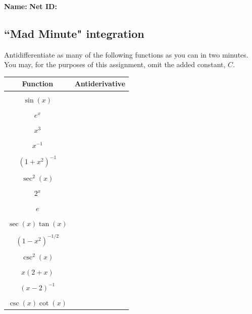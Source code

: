 \documentclass[12pt,letterpaper]{article}
\theoremstyle{definition}
\theoremstyle{remark}
\begin{document}

\begin{center}
\textbf{Name:} \underline{\hspace{2.2in}} \hfill \textbf{Net ID:} \underline{\hspace{2in}}

\end{center}


\begin{center}
\end{center}
\subsection*{``Mad Minute" integration}

\noindent Antidifferentiate as many of the following functions as you can in two minutes. You may, for the purposes of this assignment, omit the added constant, $C$. 

\begin{center}

\begin{tabularx}{\textwidth}{|c|X|}
  \hline \textbf{Function} & \textbf{Antiderivative} \\
\hline
\hline & \\ 
 $\sin(x)$  & \\ \hline
   \hline & \\ $   e^x$ & \\ \hline 
   \hline &\\$   x^3$ & \\ \hline 
   \hline &\\$   x^{-1}$ & \\ \hline 
   \hline &\\ $  (1+x^2)^{-1} $ & \\ \hline \hline &\\ $ \sec^2(x)$ & \\ \hline \hline &\\
  $ 2^x$ & \\ \hline \hline &\\
  $ e$ & \\ \hline \hline & \\
  $ \sec(x)\tan(x)$ & \\ \hline \hline &\\
  $ (1-x^2)^{-1/2}$ & \\ \hline \hline &\\
  $ \csc^2(x)$ & \\ \hline \hline &\\
  $ x(2+x)$ & \\ \hline \hline &\\
  $ (x-2)^{-1}$ & \\ \hline \hline & \\
  $ \csc(x)\cot(x)$ & \\ \hline 
\end{tabularx}
\end{center}
\end{document}
